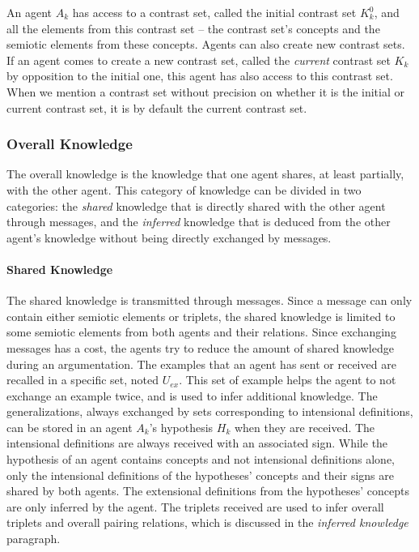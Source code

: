 An agent $A_{k}$ has access to a contrast set, called the initial contrast set $K^{0}_{k}$, and all the elements from this contrast set -- the contrast set's concepts and the semiotic elements from these concepts. Agents can also create new contrast sets. If an agent comes to create a new contrast set, called the \emph{current} contrast set $K_{k}$ by opposition to the initial one, this agent has also access to this contrast set. When we mention a contrast set without precision on whether it is the initial or current contrast set, it is by default the current contrast set.

\subsubsection{Overall Knowledge}

The overall knowledge is the knowledge that one agent shares, at least partially, with the other agent. This category of knowledge can be divided in two categories: the \emph{shared} knowledge that is directly shared with the other agent through messages, and the \emph{inferred} knowledge that is deduced from the other agent's knowledge without being directly exchanged by messages.

\paragraph{Shared Knowledge}

The shared knowledge is transmitted through messages. Since a message can only contain either semiotic elements or triplets, the shared knowledge is limited to some semiotic elements from both agents and their relations. Since exchanging messages has a cost, the agents try to reduce the amount of shared knowledge during an argumentation. The examples that an agent has sent or received are recalled in a specific set, noted $U_{ex}$. This set of example helps the agent to not exchange an example twice, and is used to infer additional knowledge. The generalizations, always exchanged by sets corresponding to intensional definitions, can be stored in an agent $A_{k}$'s hypothesis $H_{k}$ when they are received. The intensional definitions are always received with an associated sign. While the hypothesis of an agent contains concepts and not intensional definitions alone, only the intensional definitions of the hypotheses' concepts and their signs are shared by both agents. The extensional definitions from the hypotheses' concepts are only inferred by the agent. The triplets received are used to infer overall triplets and overall pairing relations, which is discussed in the \emph{inferred knowledge} paragraph.

